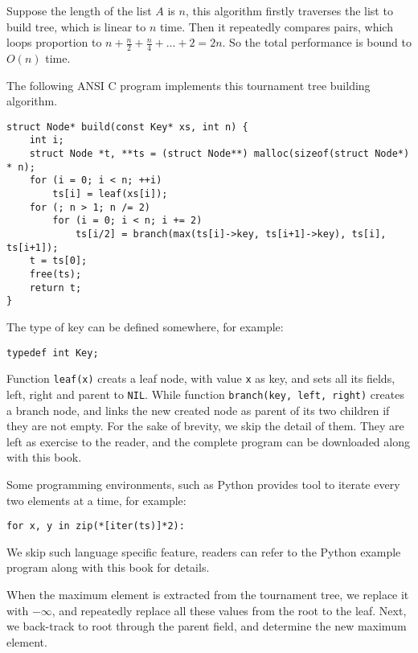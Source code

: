 \documentclass[UTF8]{article}
\begin{document}
Suppose the length of the list $A$ is $n$, this algorithm firstly traverses the list to build tree,
which is linear to $n$ time. Then it repeatedly compares pairs, which loops proportion to
$n + \frac{n}{2} + \frac{n}{4} + ... + 2 = 2n$. So the total performance is bound to $O(n)$ time.

The following ANSI C program implements this tournament tree building algorithm.

\lstset{language=C}
\begin{lstlisting}
struct Node* build(const Key* xs, int n) {
    int i;
    struct Node *t, **ts = (struct Node**) malloc(sizeof(struct Node*) * n);
    for (i = 0; i < n; ++i)
        ts[i] = leaf(xs[i]);
    for (; n > 1; n /= 2)
        for (i = 0; i < n; i += 2)
            ts[i/2] = branch(max(ts[i]->key, ts[i+1]->key), ts[i], ts[i+1]);
    t = ts[0];
    free(ts);
    return t;
}
\end{lstlisting}

The type of key can be defined somewhere, for example:

\lstset{language=C}
\begin{lstlisting}
typedef int Key;
\end{lstlisting}

Function \verb|leaf(x)| creats a leaf node, with value \verb|x| as key,
and sets all its fields, left, right and parent to \verb|NIL|.
While function \verb|branch(key, left, right)| creates a branch node, and links the new
created node as parent of its two children if they are not empty. For the sake of
brevity, we skip the detail of them. They are left as exercise to the reader, and
the complete program can be downloaded along with this book.

Some programming environments, such as Python provides tool to iterate every two elements
at a time, for example:

\lstset{language=Python}
\begin{lstlisting}
for x, y in zip(*[iter(ts)]*2):
\end{lstlisting}

We skip such language specific feature, readers can refer to the Python example program
along with this book for details.

When the maximum element is extracted from the tournament tree, we replace it with $-\infty$,
and repeatedly replace all these values from the root to the leaf. Next, we back-track
to root through the parent field, and determine the new maximum element.
\end{document}
